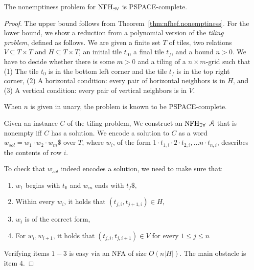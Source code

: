 \begin{theorem}
The nonemptiness problem for $\textrm{NFH}_{\exists\forall}$ is  PSPACE-complete.
\end{theorem}
\begin{proof}
The upper bound follows from Theorem~\ref{thm:nfhef.nonemptiness}. 
For the lower bound, we show a reduction from a polynomial version of the {\em tiling problem}, %
defined as follows.
We are given a finite set $T$ of tiles, two relations $V \subseteq T \times T$ and $H \subseteq T \times T$,
an initial tile $t_0$, a final tile $t_f$, and a bound $n>0$.
We have to decide whether there is some $m>0$ and a tiling of a $n \times m$-grid such that
(1) The tile $t_0$ is in the bottom left corner and the tile $t_f$ is in the top right corner,
(2) A horizontal condition: every pair of horizontal neighbors is in $H$, and
(3) A vertical condition: every pair of vertical neighbors is in $V$.

When $n$ is given in unary, the problem is known to be PSPACE-complete.

Given an instance $C$ of the tiling problem, We construct an $\textrm{NFH}_{\exists\forall}$ $\mathcal{A}$ that is nonempty iff $C$ has a solution. 
We encode a solution to $C$ as a word $w_{sol} =w_1\cdot w_2\cdot w_m\$$ over $T$, where $w_i$, of the form $1\cdot t_{1,i}\cdot 2 \cdot t_{2,i},\ldots n\cdot t_{n,i}$, describes the contents of row $i$. 

To check that $w_{sol}$ indeed encodes a solution, we need to make sure that:
\begin{enumerate}
\item $w_1$ begins with $t_0$ and $w_m$ ends with $t_f\$$,
\item Within every $w_i$, it holds that $(t_{j,i},t_{j+1,i})\in H$,
    \item $w_i$ is of the correct form,
    \item For $w_i,w_{i+1}$, it holds that $(t_{j,i}, t_{j,i+1})\in V$ for every $1\leq j\leq n$
\end{enumerate} 

Verifying items $1-3$ is easy via an NFA of size $O(n|H|)$.  
The main obstacle is item $4$. 


\end{proof}
